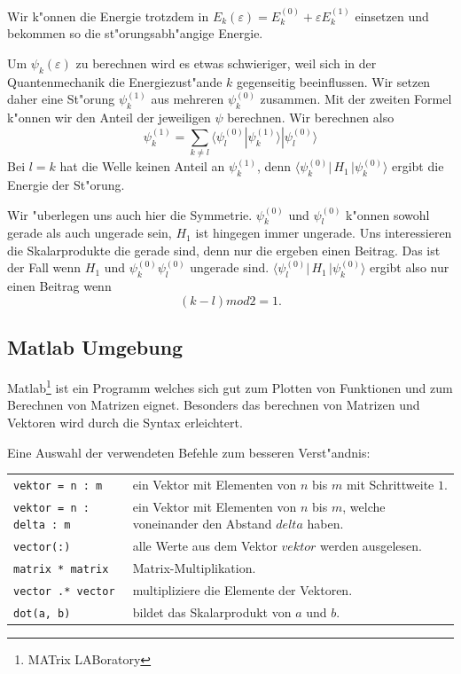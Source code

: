 \begin{refsection}
Wir k"onnen die Energie trotzdem in
$E_k(\varepsilon)=E_k^{(0)} + \varepsilon E_k^{(1)}$ einsetzen
und bekommen so die st"orungsabh"angige Energie.








Um $\psi_k(\varepsilon)$ zu berechnen wird es etwas schwieriger,
weil sich in der Quantenmechanik die Energiezust"ande $k$ gegenseitig beeinflussen.
Wir setzen daher eine St"orung $\psi_k^{(1)}$ aus mehreren $\psi_k^{(0)}$ zusammen.
Mit der zweiten Formel k"onnen wir den Anteil der jeweiligen $\psi$ berechnen.
Wir berechnen also 
\[
\psi_k^{(1)} =
\sum_{k\ne l}
\langle\psi_l^{(0)}|\psi_k^{(1)}\rangle |\psi_l^{(0)}\rangle
\]
Bei $l = k$ hat die Welle keinen Anteil an $\psi_k^{(1)}$,
denn $\langle \psi_k^{(0)}|\, H_1 \,|\psi_k^{(0)}\rangle$ ergibt die Energie der St"orung.

Wir "uberlegen uns auch hier die Symmetrie.
$\psi_k^{(0)}$ und $\psi_l^{(0)}$ k"onnen sowohl gerade als auch ungerade sein,
$H_1$ ist hingegen immer ungerade.
Uns interessieren die Skalarprodukte die gerade sind, denn nur die ergeben einen Beitrag.
Das ist der Fall wenn $H_1$ und $\psi_k^{(0)} \psi_l^{(0)}$ ungerade sind.
$\langle \psi_l^{(0)}|\, H_1 \,|\psi_k^{(0)}\rangle$ ergibt also nur einen Beitrag wenn
\[
(k-l) mod 2 = 1.
\]




\subsection{Matlab Umgebung}

Matlab\footnote{MATrix LABoratory} ist ein Programm welches sich gut zum Plotten von Funktionen
und zum Berechnen von Matrizen eignet.
Besonders das berechnen von Matrizen und Vektoren wird durch die Syntax erleichtert.

Eine Auswahl der verwendeten Befehle zum besseren Verst"andnis:

\begin{center}
	\begin{tabular}{lp{9cm}}
		\verb|vektor = n : m| & ein Vektor mit Elementen von $n$ bis $m$ mit Schrittweite $1$. \\
		\verb|vektor = n : delta : m| & ein Vektor mit Elementen von $n$ bis $m$, welche voneinander den Abstand $delta$ haben. \\
		\verb|vector(:)| & alle Werte aus dem Vektor $vektor$ werden ausgelesen. \\
		\verb|matrix * matrix| & Matrix-Multiplikation. \\
		\verb|vector .* vector| & multipliziere die Elemente der Vektoren. \\
		\verb|dot(a, b)| & bildet das Skalarprodukt von $a$ und $b$.
	\end{tabular}
\end{center}





\end{refsection}
